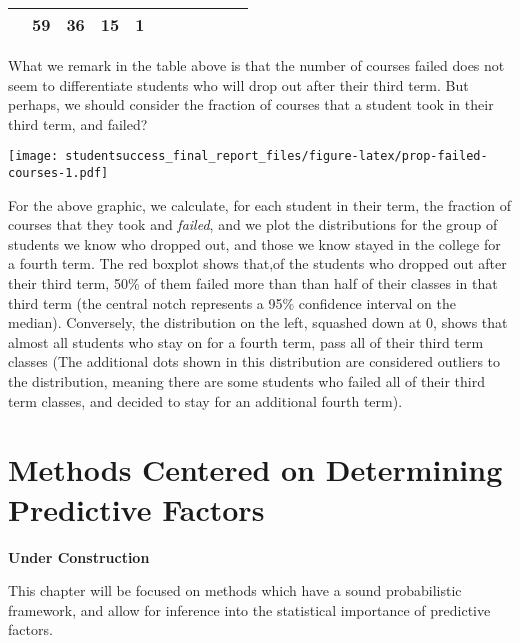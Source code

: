 \documentclass[]{book}
\theoremstyle{definition}
\theoremstyle{definition}
\theoremstyle{remark}
\begin{document}
\begin{longtable}[]{@{}ccccccccccc@{}}
\begin{minipage}[t]{0.04\columnwidth}
\end{minipage} & \begin{minipage}[t]{0.04\columnwidth}\centering\strut
59\strut
\end{minipage} & \begin{minipage}[t]{0.04\columnwidth}\centering\strut
36\strut
\end{minipage} & \begin{minipage}[t]{0.04\columnwidth}\centering\strut
15\strut
\end{minipage} & \begin{minipage}[t]{0.04\columnwidth}\centering\strut
1\strut
\end{minipage}\tabularnewline
\bottomrule
\end{longtable}

What we remark in the table above is that the number of courses failed
does not seem to differentiate students who will drop out after their
third term. But perhaps, we should consider the fraction of courses that
a student took in their third term, and failed?

\texttt{[image: studentsuccess\_final\_report\_files/figure-latex/prop-failed-courses-1.pdf]}

For the above graphic, we calculate, for each student in their term, the
fraction of courses that they took and \emph{failed}, and we plot the
distributions for the group of students we know who dropped out, and
those we know stayed in the college for a fourth term. The red boxplot
shows that,of the students who dropped out after their third term, 50\%
of them failed more than than half of their classes in that third term
(the central notch represents a 95\% confidence interval on the median).
Conversely, the distribution on the left, squashed down at 0, shows that
almost all students who stay on for a fourth term, pass all of their
third term classes (The additional dots shown in this distribution are
considered outliers to the distribution, meaning there are some students
who failed all of their third term classes, and decided to stay for an
additional fourth term).

\hypertarget{explanatory}{\chapter{Methods Centered on Determining
Predictive Factors}\label{explanatory}}

\textbf{Under Construction}

This chapter will be focused on methods which have a sound probabilistic
framework, and allow for inference into the statistical importance of
predictive factors.
\end{document}
